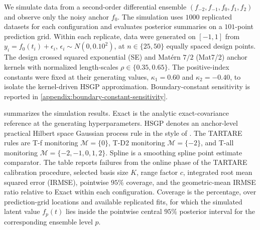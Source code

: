 \documentclass[11pt,a4paper]{article}
\theoremstyle{definition}
\theoremstyle{remark}
\begin{document}
We simulate data from a second-order differential ensemble \((f_{-2},f_{-1},f_0,f_1,f_2)\) and observe only the noisy anchor \(f_0\). The simulation uses \(1000\) replicated datasets for each configuration and evaluates posterior summaries on a \(101\)-point prediction grid. Within each replicate, data were generated on \([-1,1]\) from \(y_i=f_0(t_i)+\epsilon_i\), \(\epsilon_i\sim N(0,0.10^2)\), at \(n\in\{25,50\}\) equally spaced design points. The design crossed squared exponential (SE) and Mat\'ern \(7/2\) (Mat7/2) anchor kernels with normalized length-scales \(\rho\in\{0.35,0.65\}\). The positive-index constants were fixed at their generating values, \(\kappa_1=0.60\) and \(\kappa_2=-0.40\), to isolate the kernel-driven HSGP approximation. Boundary-constant sensitivity is reported in \cref{appendix:boundary-constant-sensitivity}.

 summarizes the simulation results. Exact is the analytic exact-covariance reference at the generating hyperparameters. HSGP denotes an anchor-level practical Hilbert space Gaussian process rule in the style of \citet{riutort2023practical}. The TARTARE rules are T-f monitoring \(\mathcal M=\{0\}\), T-D2 monitoring \(\mathcal M=\{-2\}\), and T-all monitoring \(\mathcal M=\{-2,-1,0,1,2\}\). Spline is a smoothing spline point estimate comparator. The table reports failures from the online phase of the TARTARE calibration procedure, selected basis size \(K\), range factor \(c\), integrated root mean squared error (IRMSE), pointwise \(95\%\) coverage, and the geometric-mean IRMSE ratio relative to Exact within each configuration. Coverage is the percentage, over prediction-grid locations and available replicated fits, for which the simulated latent value \(f_p(t)\) lies inside the pointwise central \(95\%\) posterior interval for the corresponding ensemble level \(p\).
\end{document}
